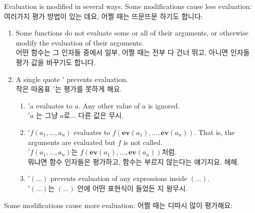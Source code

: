 \documentclass[12pt]{article}
\begin{document}
Evaluation is modified in several ways.
Some modifications cause less evaluation: \\
여러가지 평가 방법이 있는 데요, 어쩔 때는 뜨문뜨문 하기도 합니다:

\begin{enumerate}
\item Some functions do not evaluate some or all of their arguments, 
    or otherwise modify the evaluation of their arguments. \\
어떤 함수는 그 인자들 중에서 일부, 어쩔 때는 전부 다 건너 뛰고, 아니면 
인자들 평가 값을 바꾸기도 합니다.
\item A single quote $'$ prevents evaluation. \\
작은 따옴표 $'$는 평가를 못하게 해요.
    \begin{enumerate}
    \item $'a$ evaluates to $a$. Any other value of $a$ is ignored. \\
            $'a$ 는 그냥 $a$로... 다른 값은 무시.
    \item $'f(a_1, \ldots, a_n)$ evaluates to $f(\mathbf{ev}(a_1), \ldots, \mathbf{ev}(a_n))$. 
        That is, the arguments are evaluated but $f$ is not called. \\
            $'f(a_1, \ldots, a_n)$는 $f(\mathbf{ev}(a_1), \ldots, \mathbf{ev}(a_n))$처럼. \\
            뭐냐면 함수 인자들은 평가하고, 함수는 부르지 않는다는 얘기지요. 헤헤.
    \item $'(\ldots)$ prevents evaluation of any expressions inside $(...)$. \\
            $'(\ldots)$는 $(...)$ 안에 어떤 표현식이 들었든 지 왕무시.
    \end{enumerate}
\end{enumerate}

Some modifications cause more evaluation: 
어쩔 때는 디따시 많이 평가해요:
\end{document}
